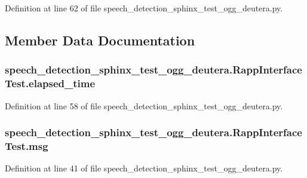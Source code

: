 Definition at line 62 of file speech\-\_\-detection\-\_\-sphinx\-\_\-test\-\_\-ogg\-\_\-deutera.\-py.



\subsection{Member Data Documentation}
\hypertarget{classspeech__detection__sphinx__test__ogg__deutera_1_1RappInterfaceTest_a876679bcc4ed3a4459d014b86f1f16eb}{
\subsubsection[{elapsed\-\_\-time}]{\setlength{\rightskip}{0pt plus 5cm}speech\-\_\-detection\-\_\-sphinx\-\_\-test\-\_\-ogg\-\_\-deutera.\-Rapp\-Interface\-Test.\-elapsed\-\_\-time}}\label{classspeech__detection__sphinx__test__ogg__deutera_1_1RappInterfaceTest_a876679bcc4ed3a4459d014b86f1f16eb}


Definition at line 58 of file speech\-\_\-detection\-\_\-sphinx\-\_\-test\-\_\-ogg\-\_\-deutera.\-py.

\hypertarget{classspeech__detection__sphinx__test__ogg__deutera_1_1RappInterfaceTest_a341fc01926ff7349fc6b677cd66ad1d4}{
\subsubsection[{msg}]{\setlength{\rightskip}{0pt plus 5cm}speech\-\_\-detection\-\_\-sphinx\-\_\-test\-\_\-ogg\-\_\-deutera.\-Rapp\-Interface\-Test.\-msg}}\label{classspeech__detection__sphinx__test__ogg__deutera_1_1RappInterfaceTest_a341fc01926ff7349fc6b677cd66ad1d4}


Definition at line 41 of file speech\-\_\-detection\-\_\-sphinx\-\_\-test\-\_\-ogg\-\_\-deutera.\-py.

